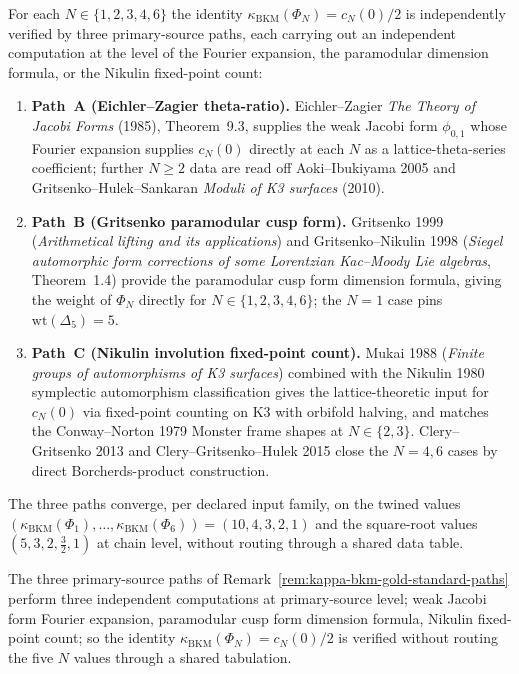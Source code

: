 \begin{remark}[Three primary-source verification paths for \texorpdfstring{$\kappa_{\mathrm{BKM}}(\Phi_N) = c_N(0)/2$}{kappa-BKM(Phi-N) = c-N(0)/2}]
\label{rem:kappa-bkm-gold-standard-paths}
For each $N \in \{1, 2, 3, 4, 6\}$ the identity
$\kappa_{\mathrm{BKM}}(\Phi_N) = c_N(0)/2$ is independently verified by
three primary-source paths, each carrying out an independent computation
at the level of the Fourier expansion, the paramodular dimension formula,
or the Nikulin fixed-point count:
\begin{enumerate}
\item \textbf{Path~A (Eichler--Zagier theta-ratio).} Eichler--Zagier
\emph{The Theory of Jacobi Forms} (1985), Theorem~9.3, supplies the
weak Jacobi form $\phi_{0,1}$ whose Fourier expansion supplies
$c_N(0)$ directly at each $N$ as a lattice-theta-series coefficient;
further $N \geq 2$ data are read off Aoki--Ibukiyama 2005 and
Gritsenko--Hulek--Sankaran \emph{Moduli of K3 surfaces} (2010).
\item \textbf{Path~B (Gritsenko paramodular cusp form).} Gritsenko 1999
(\emph{Arithmetical lifting and its applications}) and Gritsenko--Nikulin
1998 (\emph{Siegel automorphic form corrections of some Lorentzian
Kac--Moody Lie algebras}, Theorem~1.4) provide the paramodular cusp
form dimension formula, giving the weight of $\Phi_N$ directly
for $N \in \{1,2,3,4,6\}$; the $N = 1$ case pins
$\mathrm{wt}(\Delta_5) = 5$.
\item \textbf{Path~C (Nikulin involution fixed-point count).} Mukai
1988 (\emph{Finite groups of automorphisms of K3 surfaces}) combined
with the Nikulin 1980 symplectic automorphism classification gives
the lattice-theoretic input for $c_N(0)$ via fixed-point counting on
$\mathrm{K3}$ with orbifold halving, and matches the
Conway--Norton 1979 Monster frame shapes at $N \in \{2,3\}$.
Clery--Gritsenko 2013 and Clery--Gritsenko--Hulek 2015 close the
$N = 4, 6$ cases by direct Borcherds-product construction.
\end{enumerate}
The three paths converge, per declared input family, on the twined
values $(\kappa_{\mathrm{BKM}}(\Phi_1), \ldots,
\kappa_{\mathrm{BKM}}(\Phi_6)) = (10, 4, 3, 2, 1)$ and the
square-root values $(5, 3, 2, \tfrac32, 1)$ at chain level,
without routing through a shared data table.
\end{remark}

\begin{remark}
\label{rem:kappa-bkm-hziv-computation-disjoint}
The three primary-source paths of
Remark~\ref{rem:kappa-bkm-gold-standard-paths} perform three
independent computations at primary-source level; weak Jacobi form
Fourier expansion, paramodular cusp form dimension formula, Nikulin
fixed-point count; so the identity
$\kappa_{\mathrm{BKM}}(\Phi_N) = c_N(0)/2$ is verified without
routing the five $N$ values through a shared tabulation.
\end{remark}

